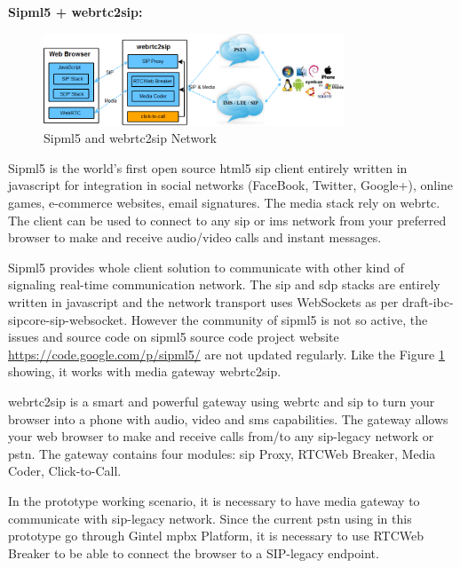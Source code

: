 \textbf{Sipml5 + webrtc2sip:}

\begin{figure}
	\centering
    	\includegraphics[width=0.80\textwidth,natwidth=610,natheight=642]{figs/sipml5_network.png}
  	\caption{Sipml5 and webrtc2sip Network}
  	\label{fig:sipml5_network}
\end{figure}

\par Sipml5 is the world's first open source \gls{html5} \gls{sip} client entirely written in javascript for integration in social networks (FaceBook, Twitter, Google+), online games, e-commerce websites, email signatures. The media stack rely on \gls{webrtc}. The client can be used to connect to any \gls{sip} or \gls{ims} network from your preferred browser to make and receive audio/video calls and instant messages.\cite{website:sipml5}

\par Sipml5 provides whole client solution to communicate with other kind of signaling real-time communication network. The \gls{sip} and \gls{sdp} stacks are entirely written in javascript and the network transport uses WebSockets as per draft-ibc-sipcore-sip-websocket. However the community of sipml5 is not so active, the issues and source code on sipml5 source code project website \url{https://code.google.com/p/sipml5/} are not updated regularly. Like the Figure \ref{fig:sipml5_network} showing, it works with media gateway webrtc2sip.

\par webrtc2sip is a smart and powerful gateway using \gls{webrtc} and \gls{sip} to turn your browser into a phone with audio, video and \gls{sms} capabilities. The gateway allows your web browser to make and receive calls from/to any \gls{sip}-legacy network or \gls{pstn}.
The gateway contains four modules: \gls{sip} Proxy, RTCWeb Breaker, Media Coder, Click-to-Call.\cite{website:webrtc2sip}

\par In the prototype working scenario, it is necessary to have media gateway to communicate with \gls{sip}-legacy network. Since the current \gls{pstn} using in this prototype go through Gintel \gls{mpbx} Platform, it is necessary to use RTCWeb Breaker to be able to connect the browser to a SIP-legacy endpoint.

